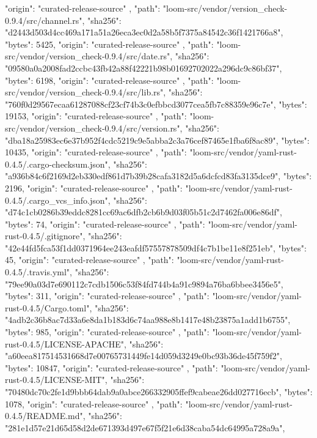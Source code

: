 {{      "origin": "curated-release-source"
    },
    {
      "path": "loom-src/vendor/version_check-0.9.4/src/channel.rs",
      "sha256": "d2443d503d4cc469a171a51a26eca3ec0d2a58b5f7375a84542c36f1421766a8",
      "bytes": 5425,
      "origin": "curated-release-source"
    },
    {
      "path": "loom-src/vendor/version_check-0.9.4/src/date.rs",
      "sha256": "09580a0a2008fad2ccbc43fb42a88f42221b98b01692702022a296dc9c86bf37",
      "bytes": 6198,
      "origin": "curated-release-source"
    },
    {
      "path": "loom-src/vendor/version_check-0.9.4/src/lib.rs",
      "sha256": "760f0d29567ecaa61287088cf23cf74b3c0efbbcd3077cea5fb7c88359e96c7e",
      "bytes": 19153,
      "origin": "curated-release-source"
    },
    {
      "path": "loom-src/vendor/version_check-0.9.4/src/version.rs",
      "sha256": "dba18a25983ec6e37b952f4cdc5219c9e5abba2c3a76cef87465e1fba6f8ac89",
      "bytes": 10435,
      "origin": "curated-release-source"
    },
    {
      "path": "loom-src/vendor/yaml-rust-0.4.5/.cargo-checksum.json",
      "sha256": "a936b84c6f2169d2eb330edf861d7b39b28cafa3182d5a6dcfcd83fa3135dce9",
      "bytes": 2196,
      "origin": "curated-release-source"
    },
    {
      "path": "loom-src/vendor/yaml-rust-0.4.5/.cargo_vcs_info.json",
      "sha256": "d74c1cb0286b39eddc8281cc69ac6dfb2cb6b9d03f05b51c2d7462fa006e86df",
      "bytes": 74,
      "origin": "curated-release-source"
    },
    {
      "path": "loom-src/vendor/yaml-rust-0.4.5/.gitignore",
      "sha256": "42e44fd5fca53f1dd0371964ee243eafdf57557878509df4c7b1be11e8f251eb",
      "bytes": 45,
      "origin": "curated-release-source"
    },
    {
      "path": "loom-src/vendor/yaml-rust-0.4.5/.travis.yml",
      "sha256": "79ee90a03d7e690112c7cdb1506c53f84fd744b4a91c9894a76ba6bbee3456e5",
      "bytes": 311,
      "origin": "curated-release-source"
    },
    {
      "path": "loom-src/vendor/yaml-rust-0.4.5/Cargo.toml",
      "sha256": "4adb2c36b8ac7d33a6e8da1b183d6c74aa988e8b1417e48b23875a1add1b6755",
      "bytes": 985,
      "origin": "curated-release-source"
    },
    {
      "path": "loom-src/vendor/yaml-rust-0.4.5/LICENSE-APACHE",
      "sha256": "a60eea817514531668d7e00765731449fe14d059d3249e0bc93b36de45f759f2",
      "bytes": 10847,
      "origin": "curated-release-source"
    },
    {
      "path": "loom-src/vendor/yaml-rust-0.4.5/LICENSE-MIT",
      "sha256": "70480dc70c2fe1d9bbb64dab9a0abce266332905ffef9cabeae26dd027716ecb",
      "bytes": 1078,
      "origin": "curated-release-source"
    },
    {
      "path": "loom-src/vendor/yaml-rust-0.4.5/README.md",
      "sha256": "281e1d57e21d65d58d2de671393d497e67f5f21e6d38caba54dc64995a728a9a",
}}
